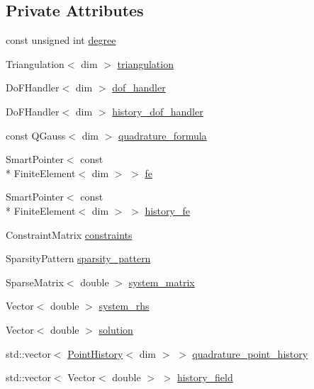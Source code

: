 \subsection*{Private Attributes}
\begin{DoxyCompactItemize}
\item 
const unsigned int \hyperlink{classvsf_1_1ApShear_ae4927f95e4a98c107d743a078a9b1bc8}{degree}
\item 
Triangulation$<$ dim $>$ \hyperlink{classvsf_1_1ApShear_a53d0e9d3fdabcac44cc7c6408ace451b}{triangulation}
\item 
Do\-F\-Handler$<$ dim $>$ \hyperlink{classvsf_1_1ApShear_a55da0ced5f7ee7c16a518073f4524ffb}{dof\-\_\-handler}
\item 
Do\-F\-Handler$<$ dim $>$ \hyperlink{classvsf_1_1ApShear_acdcfb9ec77c56722ce42173f7599c336}{history\-\_\-dof\-\_\-handler}
\item 
const Q\-Gauss$<$ dim $>$ \hyperlink{classvsf_1_1ApShear_a2926794d4cbeed7550443a4999868110}{quadrature\-\_\-formula}
\item 
Smart\-Pointer$<$ const \\*
Finite\-Element$<$ dim $>$ $>$ \hyperlink{classvsf_1_1ApShear_a228388a897a688b79d0800f3bb18697f}{fe}
\item 
Smart\-Pointer$<$ const \\*
Finite\-Element$<$ dim $>$ $>$ \hyperlink{classvsf_1_1ApShear_a3c2f9d0e479ed2ebcb3660a3b7b72aee}{history\-\_\-fe}
\item 
Constraint\-Matrix \hyperlink{classvsf_1_1ApShear_afcd25b4c0be9a4c7e69165e6eb151240}{constraints}
\item 
Sparsity\-Pattern \hyperlink{classvsf_1_1ApShear_a065cb85ed84df073fd1b726667eebcc3}{sparsity\-\_\-pattern}
\item 
Sparse\-Matrix$<$ double $>$ \hyperlink{classvsf_1_1ApShear_a8735861f0a5530262407cd52b7a1b386}{system\-\_\-matrix}
\item 
Vector$<$ double $>$ \hyperlink{classvsf_1_1ApShear_ab1046cf38cb6535dd0ab78793bccf6a1}{system\-\_\-rhs}
\item 
Vector$<$ double $>$ \hyperlink{classvsf_1_1ApShear_ae4ee8cb26cbb92aa25fa91d2eb2198db}{solution}
\item 
std\-::vector$<$ \hyperlink{structvsf_1_1PointHistory}{Point\-History}$<$ dim $>$ $>$ \hyperlink{classvsf_1_1ApShear_aeb702a26aef2b0a7d0d27d46909b81b9}{quadrature\-\_\-point\-\_\-history}
\item 
std\-::vector$<$ Vector$<$ double $>$ $>$ \hyperlink{classvsf_1_1ApShear_ab47e19f00b1a5475699673c44d48ab8d}{history\-\_\-field}

\end{DoxyCompactItemize}
